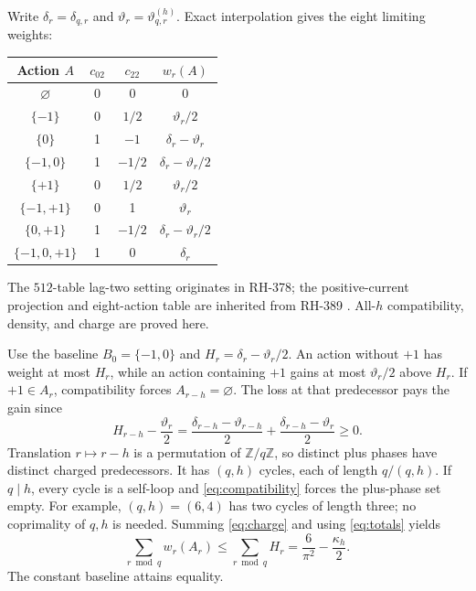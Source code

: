 \documentclass[11pt]{article}
\theoremstyle{definition}
\theoremstyle{remark}
\newcommand{\dd}{\delta}
\newcommand{\thh}{\vartheta}
\newcommand{\kap}{\kappa}
\newcommand{\Zq}{\mathbb Z/q\mathbb Z}
\begin{document}
Write \(\dd_r=\dd_{q,r}\) and \(\thh_r=\thh^{(h)}_{q,r}\).  Exact
interpolation gives the eight limiting weights:
\begin{center}
\small
\begin{tabular}{@{}c@{\qquad}c@{\qquad}c@{\qquad}c@{}}
\toprule
Action \(A\)&\(c_{02}\)&\(c_{22}\)&\(w_r(A)\)\\
\midrule
\(\varnothing\)&0&0&0\\
\(\{-1\}\)&0&\(1/2\)&\(\thh_r/2\)\\
\(\{0\}\)&1&\(-1\)&\(\dd_r-\thh_r\)\\
\(\{-1,0\}\)&1&\(-1/2\)&\(\dd_r-\thh_r/2\)\\
\(\{+1\}\)&0&\(1/2\)&\(\thh_r/2\)\\
\(\{-1,+1\}\)&0&1&\(\thh_r\)\\
\(\{0,+1\}\)&1&\(-1/2\)&\(\dd_r-\thh_r/2\)\\
\(\{-1,0,+1\}\)&1&0&\(\dd_r\)\\
\bottomrule
\end{tabular}
\end{center}
The \(512\)-table lag-two setting originates in RH-378; the positive-current
projection and eight-action table are inherited from RH-389
\cite{RH378,RH389}.  All-\(h\) compatibility, density, and charge are proved
here.

Use the baseline \(B_0=\{-1,0\}\) and
\(H_r=\dd_r-\thh_r/2\).  An action without \(+1\) has weight at most
\(H_r\), while an action containing \(+1\) gains at most \(\thh_r/2\)
above \(H_r\).  If \(+1\in A_r\), compatibility forces
\(A_{r-h}=\varnothing\).  The loss at that predecessor pays the gain since
\begin{equation}
 H_{r-h}-\frac{\thh_r}{2}
 =\frac{\dd_{r-h}-\thh_{r-h}}2+
  \frac{\dd_{r-h}-\thh_r}2\ge0.
 \label{eq:charge}
\end{equation}
Translation \(r\mapsto r-h\) is a permutation of \(\Zq\), so distinct
plus phases have distinct charged predecessors.  It has \((q,h)\) cycles,
each of length \(q/(q,h)\).  If \(q\mid h\), every cycle is a self-loop
and \eqref{eq:compatibility} forces the plus-phase set empty.  For example,
\((q,h)=(6,4)\) has two cycles of length three; no coprimality of \(q,h\)
is needed.  Summing \eqref{eq:charge} and using \eqref{eq:totals} yields
\begin{equation}
 \sum_{r\bmod q}w_r(A_r)\le
 \sum_{r\bmod q}H_r=\frac6{\pi^2}-\frac{\kap_h}{2}.
 \label{eq:signed-bound}
\end{equation}
The constant baseline attains equality.
\end{document}
